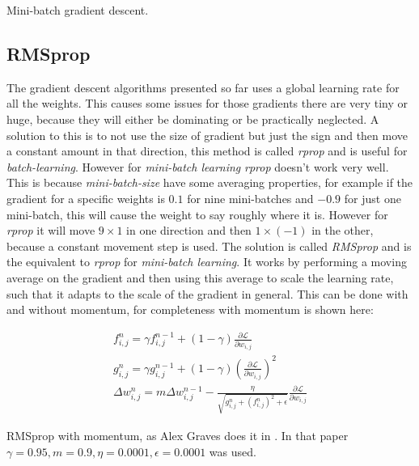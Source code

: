 \begin{algorithm}[h]
 \DontPrintSemicolon
 \caption{Mini-batch gradient descent.}
 \label{algorithm:gradientdescent:mini-batch}
\end{algorithm}

\subsection{RMSprop}

The gradient descent algorithms presented so far uses a global learning rate for all the weights. This causes some issues for those gradients there are very tiny or huge, because they will either be dominating or be practically neglected. A solution to this is to not use the size of gradient but just the sign and then move a constant amount in that direction, this method is called \textit{rprop} and is useful for \textit{batch-learning}. However for \textit{mini-batch learning} \textit{rprop} doesn't work very well. This is because \textit{mini-batch-size} have some averaging properties, for example if the gradient for a specific weights is $0.1$ for nine mini-batches and $-0.9$ for just one mini-batch, this will cause the weight to say roughly where it is. However for \textit{rprop} it will move $9 \times 1$ in one direction and then $1 \times (-1)$ in the other, because a constant movement step is used. The solution is called \textit{RMSprop} and is the equivalent to \textit{rprop} for \textit{mini-batch learning}. It works by performing a moving average on the gradient and then using this average to scale the learning rate, such that it adapts to the scale of the gradient in general. This can be done with and without momentum, for completeness with momentum is shown here:

\begin{equationbox}[H]
\begin{equation*}
\begin{aligned}
f_{i,j}^n = \gamma f_{i,j}^{n-1} + (1 - \gamma) \frac{\partial \mathcal{L}}{\partial w_{i,j}} \\
g_{i,j}^n = \gamma g_{i,j}^{n-1} + (1 - \gamma) \left(\frac{\partial \mathcal{L}}{\partial w_{i,j}}\right)^2 \\
\Delta w_{i,j}^n = m \Delta w_{i,j}^{n-1} - \frac{\eta}{\sqrt{g_{i,j}^n + \left(f_{i,j}^n\right)^2 + \epsilon}} \frac{\partial \mathcal{L}}{\partial w_{i,j}}
\end{aligned}
\end{equation*}
\caption{RMSprop with momentum, as Alex Graves does it in \cite{graves-generating-sequences}. In that paper $\gamma = 0.95, m = 0.9, \eta = 0.0001, \epsilon = 0.0001$ was used.}
\end{equationbox}

